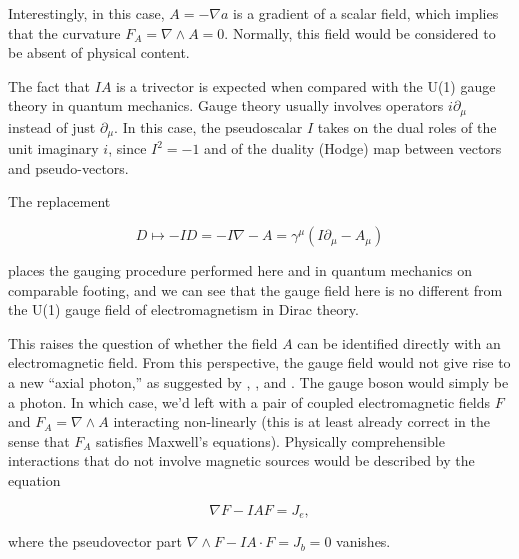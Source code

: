 \documentclass{article}
\begin{document}
  Interestingly, in this case, $A = -\nabla a$ is a gradient of a scalar field, which implies that the curvature $F_A = \nabla \wedge A = 0$. Normally, this field would be considered to be absent of physical content. 

  The fact that $IA$ is a trivector is expected when compared with the U(1) gauge theory in quantum mechanics. Gauge theory usually involves operators $i \partial_\mu$ instead of just $\partial_\mu$. In this case, the pseudoscalar $I$ takes on the dual roles of the unit imaginary $i$, since $I^2 = -1$ and of the duality (Hodge) map between vectors and pseudo-vectors.

  The replacement 

  \begin{equation}
    D \mapsto - I D = -I \nabla - A = \gamma^\mu (I \partial_\mu - A_\mu)
  \end{equation}

  places the gauging procedure performed here and in quantum mechanics on comparable footing, and we can see that the gauge field here is no different from the U(1) gauge field of electromagnetism in Dirac theory.

  This raises the question of whether the field $A$ can be identified directly with an electromagnetic field. From this perspective, the gauge field would not give rise to a new ``axial photon,'' as suggested by \cite{malik}, \cite{naik}, and \cite{pmn}. The gauge boson would simply be a photon. In which case, we'd left with a pair of coupled electromagnetic fields $F$ and $F_A = \nabla \wedge A$ interacting non-linearly (this is at least already correct in the sense that $F_A$ satisfies Maxwell's equations). Physically comprehensible interactions that do not involve magnetic sources would be described by the equation

  \begin{equation}
    \nabla F - I A F = J_e,
  \end{equation}

  where the pseudovector part $\nabla \wedge F - I A \cdot F = J_b = 0$ vanishes.



\end{document}
